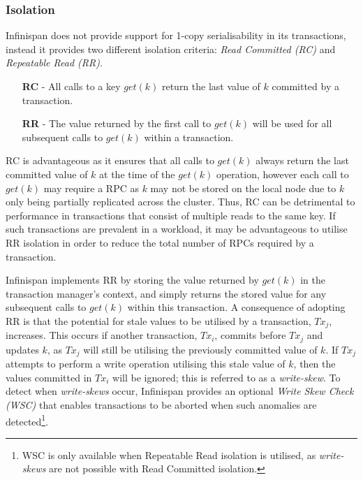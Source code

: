 	        \subsubsection*{Isolation}\label{ssec:infi_isolation}
	        Infinispan does not provide support for 1-copy serialisability in its transactions, instead it provides two different isolation criteria: \emph{Read Committed (RC)} and \emph{Repeatable Read (RR)}.  
	        
	        \begin{itemize}
	            \item[\textbf{RC} -] All calls to a key $get(k)$ return the last value of $k$ committed by a transaction.  
	            \item[\textbf{RR} -] The value returned by the first call to $get(k)$ will be used for all subsequent calls to $get(k)$ within a transaction.
	        \end{itemize}   
	        
	        RC is advantageous as it ensures that all calls to $get(k)$ always return the last committed value of $k$ at the time of the $get(k)$ operation, however each call to $get(k)$ may require a RPC as $k$ may not be stored on the local node due to $k$ only being partially replicated across the cluster. Thus, RC can be detrimental to performance in transactions that consist of multiple reads to the same key.  If such transactions are prevalent in a workload, it may be advantageous to utilise RR isolation in order to reduce the total number of RPCs required by a transaction.  
	        
	        Infinispan implements RR by storing the value returned by $get(k)$ in the transaction manager's context, and simply returns the stored value for any subsequent calls to $get(k)$ within this transaction.  A consequence of adopting RR is that the potential for stale values to be utilised by a transaction, $Tx_j$, increases.  This occurs if another transaction, $Tx_i$, commits before $Tx_j$ and updates $k$, as $Tx_j$ will still be utilising the previously committed value of $k$.  If $Tx_j$ attempts to perform a write operation utilising this stale value of $k$, then the values committed in $Tx_i$ will be ignored; this is referred to as a \emph{write-skew}.  To detect when \emph{write-skews} occur, Infinispan provides an optional \emph{Write Skew Check (WSC)} that enables transactions to be aborted when such anomalies are detected\footnote{WSC is only available when Repeatable Read isolation is utilised, as \emph{write-skews} are not possible with Read Committed isolation.}.  
	        
